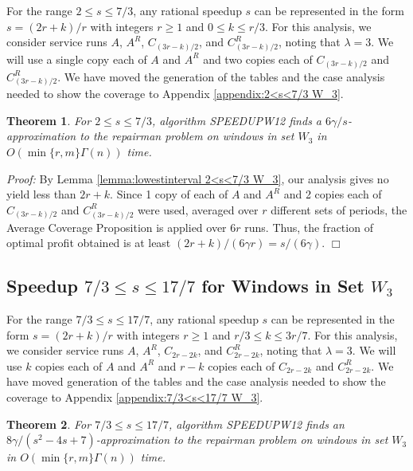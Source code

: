 \documentclass[11pt]{article}
\newtheorem{theorem}{Theorem}[section]
\newcommand\QED{\ifhmode\allowbreak\else\nobreak\fi
\quad\nobreak$\Box$\medbreak}
\newcommand{\proofstart}{\par\noindent \emph{Proof:} }
\newcommand{\proofend}{\QED\par}
\newenvironment{proof}{\proofstart}{\proofend}
\begin{document}
For the range $2 \leq s \leq 7/3$, any rational speedup $s$ can be represented in the form $s = (2r + k)/r$ with integers $r \geq 1$ and $0 \leq k \leq r/3$.  For this analysis, we consider service runs $A$, $A^R$, $C_{(3r - k)/2}$, and $C_{(3r - k)/2}^R$, noting that $\lambda = 3$.  We will use a single copy each of $A$ and $A^R$ and two copies each of $C_{(3r - k)/2}$ and $C_{(3r - k)/2}^R$.  We have moved the  generation of the tables and the case analysis needed to show the coverage to Appendix \ref{appendix:2<s<7/3 W_3}.

\begin{theorem}
For $2 \leq s \leq 7/3$, algorithm SPEEDUPW12 finds a $6\gamma/s$-approximation to the repairman problem on windows in set $W_3$ in $O(\min\{r, m\}\Gamma(n))$ time.
\end{theorem}

\begin{proof}
By Lemma \ref{lemma:lowestinterval 2<s<7/3 W_3}, our analysis gives no yield less than $2r + k$.  Since 1 copy of each of $A$ and $A^R$ and 2 copies each of $C_{(3r - k)/2}$ and $C_{(3r - k)/2}^R$ were used, averaged over $r$ different sets of periods, the Average Coverage Proposition is applied over $6r$ runs.  Thus, the fraction of optimal profit obtained is at least ${ (2r + k)/(6\gamma  r) } = {s/(6\gamma) }$.
\end{proof}


\subsection{Speedup $7/3 \leq s \leq 17/7$ for Windows in Set $W_3$}

For the range $7/3 \leq s \leq 17/7$, any rational speedup $s$ can be represented in the form $s = (2r + k)/r$ with integers $r \geq 1$ and $r/3 \leq k \leq 3r/7$.  For this analysis, we consider service runs $A$, $A^R$, $C_{2r - 2k}$, and $C_{2r - 2k}^R$, noting that $\lambda = 3$.  We will use $k$ copies each of $A$ and $A^R$ and $r - k$ copies each of $C_{2r - 2k}$ and $C_{2r - 2k}^R$.  We have moved generation of the tables and the case analysis needed to show the coverage to Appendix \ref{appendix:7/3<s<17/7 W_3}.

\begin{theorem}
For $7/3 \leq s \leq 17/7$, algorithm SPEEDUPW12 finds an $8\gamma/(s^2 - 4s + 7)$-approximation to the repairman problem on windows in set $W_3$ in $O(\min\{r, m\}\Gamma(n))$ time.
\end{theorem}
\end{document}

